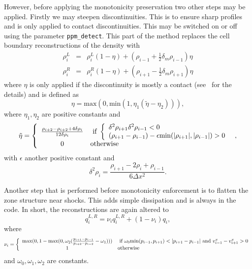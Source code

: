\documentclass{article}
\begin{document}
However, before applying the monotonicity preservation two other steps
may be applied. Firstly we may steepen discontinuities. This is to
ensure sharp profiles and is only applied to contact
discontinuities. This may be switched on or off using the parameter
{\tt ppm\_detect}. This part of the method replaces the cell boundary
reconstructions of the density with
\begin{eqnarray}
  \label{eq:ppmdetect}
  \rho_i^L & = & \rho_i^L (1-\eta) + \left(\rho_{i-1} + \frac{1}{2}
    \delta_m \rho_{i-1} \right) \eta \\
  \rho_i^R & = & \rho_i^R (1-\eta) + \left(\rho_{i+1} - \frac{1}{2}
    \delta_m \rho_{i+1} \right) \eta
\end{eqnarray}
where $\eta$ is only applied if the discontinuity is mostly a contact
(see~\cite{ppm} for the details) and is defined as
\begin{equation}
  \label{eq:ppmeta}
  \eta = \textrm{max}(0, \textrm{min}(1, \eta_1 (\tilde{\eta} - \eta_2))),
\end{equation}
where $\eta_1,\eta_2$ are positive constants and
\begin{equation}
  \label{eq:ppmetatilde}
  \tilde{\eta} = \left\{ \begin{array}{c l} 
  \frac{\rho_{i+2} - \rho_{i+2} + 4 \delta\rho_i}{12\delta\rho_i} &
  \textrm{ if } \left\{
\begin{array}{l}
  \delta^2\rho_{i+1}\delta^2\rho_{i-1} < 0\\
  (\rho_{i+1} - \rho_{i-1}) - \epsilon \textrm{min}(|\rho_{i+1}|,|\rho_{i-1}|) >
  0\nonumber
\end{array} \right. \\
  0 & \textrm{otherwise} \end{array} \right.,
\end{equation}
with $\epsilon$ another positive constant and
\begin{equation}
  \label{eq:ppmd2rho}
  \delta^2\rho_i = \frac{\rho_{i+1} - 2\rho_i + \rho_{i-1}}{6\Delta
    x^2}.  
\end{equation}

Another step that is performed before monotonicity enforcement is to
flatten the zone structure near shocks. This adds simple dissipation
and is always in the code. In short, the reconstructions are again
altered to
\begin{equation}
  \label{eq:ppmflatten}
  q_i^{L,R} = \nu_i q_i^{L,R} + (1 - \nu_i) q_i,
\end{equation}
where
\begin{equation}
  \label{eq:ppmflatten2}
  \nu_i = \left\{ \begin{array}{c l} {\rm max}(0, 1 - \textrm{max}(0, \omega_2
      (\frac{p_{i+1} - p_{i-1}}{p_{i+2} - p_{i-2}} - \omega_1))) & \textrm{
        if } \omega_0 \textrm{min}(p_{i-1}, p_{i+1}) < |p_{i+1} - p_{i - 1}| 
      \textrm{ and } v^x_{i-1} - v^x_{i+1} > 0 \\
      1 & \textrm{otherwise} \end{array} \right.
\end{equation}
and $\omega_0, \omega_1,\omega_2$ are constants.
\end{document}
